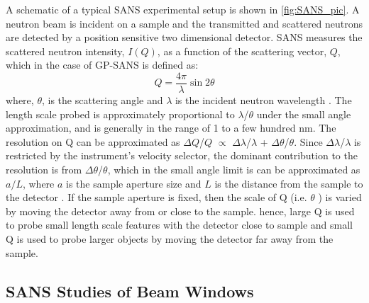 A schematic of a typical SANS experimental setup is shown in \cref{fig:SANS_pic}. A neutron beam is incident on a sample and the transmitted and scattered neutrons are detected by a position sensitive two dimensional detector. SANS measures the scattered neutron intensity, $I(Q)$, as a function of the scattering vector, $Q$, which in the case of GP-SANS is defined as:
\begin{equation}
    Q = \frac{4 \pi}{\lambda}\sin{2 \theta}
    \label{eq:Q}
\end{equation}
where, $\theta$, is the scattering angle and $\lambda$ is the incident neutron wavelength \cite{Pynn1990, Hammouda2008, Feigin2013, Glinka2004}. The length scale probed is approximately proportional to $\lambda$/$\theta$ under the small angle approximation, and is generally in the range of 1 to a few hundred nm. The resolution on Q can be approximated as $ \Delta Q$/$Q$ $\propto$ $\Delta \lambda$/$\lambda$ + $\Delta\theta$/$\theta$. Since $\Delta \lambda$/$\lambda$ is restricted by the instrument's velocity selector, the dominant contribution to the resolution is from $\Delta\theta$/$\theta$, which in the small angle limit is can be approximated as $a/L$, where $a$ is the sample aperture size and $L$ is the distance from the sample to the detector \cite{Pynn1990, Hammouda2008, Feigin2013, Glinka2004}. If the sample aperture is fixed, then the scale of Q (i.e. $\theta$ ) is varied by moving the detector away from or close to the sample. hence, large Q is used to probe small length scale features with the detector close to sample and small Q is used to probe larger objects by moving the detector far away from the sample.

\subsection{SANS Studies of Beam Windows}

